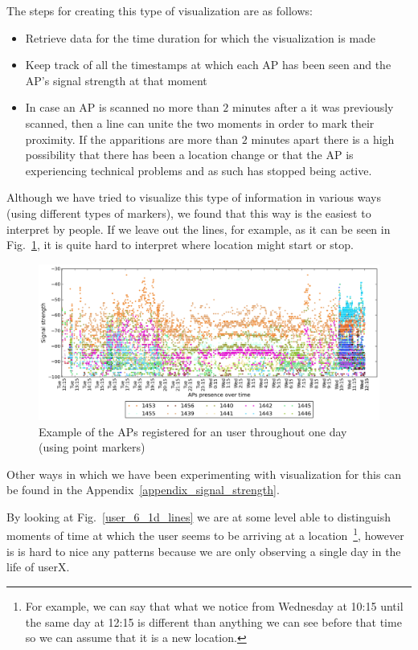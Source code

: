 The steps for creating this type of visualization are as follows:
\begin{itemize}
  \item Retrieve data for the time duration for which the visualization is made
  \item Keep track of all the timestamps at which each AP has been seen and the
  AP's signal strength at that moment
  \item In case an AP is scanned no more than $2$ minutes after a it was
  previously scanned, then a line can unite the two moments in order to mark
  their proximity. If the apparitions are more than $2$ minutes apart there is
  a high possibility that there has been a location change or that the AP is
  experiencing technical problems and as such has stopped being active.
\end{itemize}

Although we have tried to visualize this type of information in various ways
(using different types of markers), we found that this way is the easiest to
interpret by people. If we leave out the lines, for example, as it can be seen
in Fig.~\ref{user_6_1d_point}, it is quite hard to interpret where location
might start or stop.

\begin{figure}[h]
\centering
\includegraphics[height =
0.45\textwidth]{figures/point_user_6_sorted_1days_plot.png}
\caption{Example of the APs registered for an user throughout one day (using
point markers)}
\label{user_6_1d_point}
\end{figure}

Other ways in which we have been experimenting with visualization for this can
be found in the Appendix~\ref{appendix_signal_strength}.

By looking at Fig.~\ref{user_6_1d_lines} we are at some level able to
distinguish moments of time at which the user seems to be arriving at a
location~\footnote{For example, we can say that what we notice from Wednesday
at 10:15 until the same day at 12:15 is different than anything we can see
before that time so we can assume that it is a new location.}, however is is
hard to nice any patterns because we are only observing a single day in the life
of userX. 

